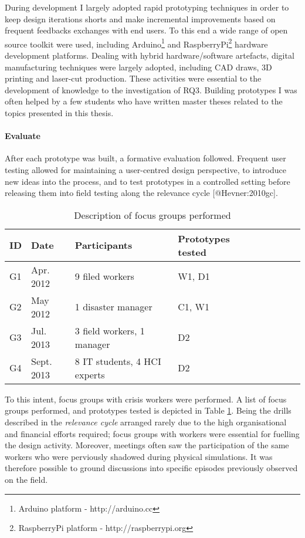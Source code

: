 During development I largely adopted rapid prototyping techniques in
order to keep design iterations shorts and make incremental improvements
based on frequent feedbacks exchanges with end users. To this end a wide
range of open source toolkit were used, including Arduino\footnote{Arduino
  platform - http://arduino.cc} and RaspberryPi\footnote{RaspberryPi
  platform - http://raspberrypi.org} hardware development platforms.
Dealing with hybrid hardware/software artefacts, digital manufacturing
techniques were largely adopted, including CAD draws, 3D printing and
laser-cut production. These activities were essential to the development
of knowledge to the investigation of RQ3. Building prototypes I was
often helped by a few students who have written master theses related to
the topics presented in this thesis.

\paragraph{Evaluate}\label{evaluate}

After each prototype was built, a formative evaluation followed.
Frequent user testing allowed for maintaining a user-centred design
perspective, to introduce new ideas into the process, and to test
prototypes in a controlled setting before releasing them into field
testing along the relevance cycle {[}@Hevner:2010gc{]}.

\begin{table}[h]
    \centering
    \caption{Description of focus groups performed}
    \label{labtests}
\begin{tabular}{@{}lllllllll@{}}    
\toprule
ID  & Date        & Participants      & Prototypes tested \\
\midrule
G1  & Apr. 2012  & 9 filed workers     & W1, D1 \\
G2  & May 2012   & 1 disaster manager  & C1, W1 \\
G3  & Jul. 2013  & 3 field workers, 1 manager & D2 \\
G4  & Sept. 2013 & 8 IT students, 4 HCI experts & D2 \\
\bottomrule
\end{tabular}
\end{table}

To this intent, focus groups with crisis workers were performed. A list
of focus groups performed, and prototypes tested is depicted in Table
\ref{labtests}. Being the drills described in the \emph{relevance cycle}
arranged rarely due to the high organisational and financial efforts
required; focus groups with workers were essential for fuelling the
design activity. Moreover, meetings often saw the participation of the
same workers who were perviously shadowed during physical simulations.
It was therefore possible to ground discussions into specific episodes
previously observed on the field.

